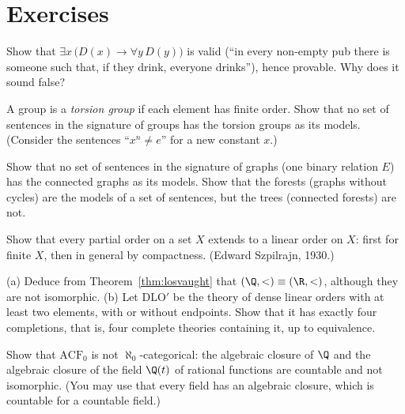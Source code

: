 \section{Exercises}

\begin{exercise}[$\star$]\label{ex:drinker}
Show that $\exists x\,\bigl(D(x)\to\forall y\,D(y)\bigr)$ is valid (``in every non-empty pub there is someone such that, if they drink, everyone drinks''), hence provable. Why does it sound false?
\end{exercise}

\begin{exercise}[$\star$]\label{ex:torsion}
A group is a \emph{torsion group} if each element has finite order. Show that no set of sentences in the signature of groups has the torsion groups as its models. (Consider the sentences ``$x^n\ne e$'' for a new constant $x$.)
\end{exercise}

\begin{exercise}[$\star\star$]\label{ex:connected}
Show that no set of sentences in the signature of graphs (one binary relation $E$) has the connected graphs as its models. Show that the forests (graphs without cycles) are the models of a set of sentences, but the trees (connected forests) are not.
\end{exercise}

\begin{exercise}[$\star\star$]\label{ex:szpilrajn}
Show that every partial order on a set $X$ extends to a linear order on $X$: first for finite $X$, then in general by compactness. (Edward Szpilrajn, 1930.)
\end{exercise}

\begin{exercise}[$\star\star$]\label{ex:dlo}
(a) Deduce from Theorem~\ref{thm:losvaught} that $(\Q,<)\equiv(\R,<)$, although they are not isomorphic. (b) Let $\mathrm{DLO}'$ be the theory of dense linear orders with at least two elements, with or without endpoints. Show that it has exactly four completions, that is, four complete theories containing it, up to equivalence.
\end{exercise}

\begin{exercise}[$\star$]\label{ex:acfnotcountable}
Show that $\mathrm{ACF}_0$ is not $\aleph_0$-categorical: the algebraic closure of $\Q$ and the algebraic closure of the field $\Q(t)$ of rational functions are countable and not isomorphic. (You may use that every field has an algebraic closure, which is countable for a countable field.)
\end{exercise}

